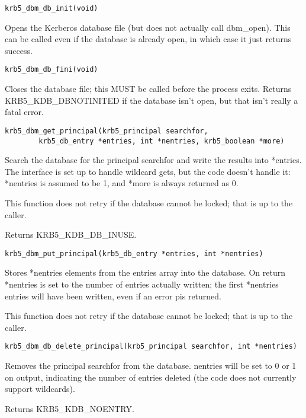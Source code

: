\begin{verbatim}
krb5_dbm_db_init(void)
\end{verbatim}

Opens the Kerberos database file (but does not actually call
dbm_open).  This can be called even if the database is already open,
in which case it just returns success.

\begin{verbatim}
krb5_dbm_db_fini(void)
\end{verbatim}

Closes the database file; this MUST be called before the process
exits.  Returns KRB5_KDB_DBNOTINITED if the database isn't open, but
that isn't really a fatal error.

\begin{verbatim}
krb5_dbm_get_principal(krb5_principal searchfor, 
        krb5_db_entry *entries, int *nentries, krb5_boolean *more)
\end{verbatim}

Search the database for the principal searchfor and write the results
into *entries.  The interface is set up to handle wildcard gets, but
the code doesn't handle it: *nentries is assumed to be 1, and *more is
always returned as 0.

This function does not retry if the database cannot be locked; that is
up to the caller.  

Returns KRB5_KDB_DB_INUSE.

\begin{verbatim}
krb5_dbm_put_principal(krb5_db_entry *entries, int *nentries)
\end{verbatim}

Stores *nentries elements from the entries array into the database.
On return *nentries is set to the number of entries actually written;
the first *nentries entries will have been written, even if an error
pis returned.

This function does not retry if the database cannot be locked; that is
up to the caller.

\begin{verbatim}
krb5_dbm_db_delete_principal(krb5_principal searchfor, int *nentries)
\end{verbatim}

Removes the principal searchfor from the database.  nentries will be
set to 0 or 1 on output, indicating the number of entries deleted (the
code does not currently support wildcards).

Returns KRB5_KDB_NOENTRY.


